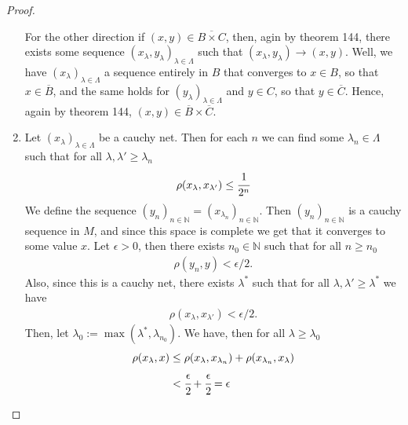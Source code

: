 \documentclass[12pt]{extarticle}
\newcommand{\N}{\mathbb{N}}
\newcommand{\<}{\langle}
\renewcommand{\>}{\rangle}
\theoremstyle{definition}
\begin{document}
\begin{proof}
\begin{enumerate}
    For the other direction if $(x,y) \in \overline{B \times C}$, then, agin by theorem 144, there exists some sequence
    $(x_{\lambda}, y_{\lambda})_{\lambda \in \Lambda}$ such that $(x_{\lambda}, y_{\lambda}) \to (x,y)$. Well, we have $(x_{\lambda})_{\lambda \in \Lambda}$ a sequence entirely in $B$ that converges to $x \in B$,
    so that $x \in \overline{B}$, and the same holds for $(y_{\lambda})_{\lambda \in \Lambda}$ and $y \in C$, so that $y \in \overline{C}$. Hence, again by theorem 144, $(x,y) \in \overline{B} \times \overline{C}$.
  \item
    Let $(x_{\lambda})_{\lambda \in \Lambda}$ be a cauchy net. Then for each $n$ we can find some $\lambda_n \in \Lambda$ such that for all $\lambda, \lambda' \geq \lambda_n$
    \begin{align*}
      \rho(x_{\lambda}, x_{\lambda'}) \leq \cfrac{1}{2^n}
    \end{align*}
    We define the sequence $(y_n)_{n \in \N} = (x_{\lambda_n})_{n \in \N}$. Then $(y_n)_{n \in \N}$ is a cauchy sequence in $M$, and since
    this space is complete we get that it converges to some value $x$. Let $\epsilon>0$, then there exists $n_0 \in \N$ such that for all $n \geq n_0$
    \begin{align*}
      \rho(y_n, y) < \epsilon/2.
    \end{align*}
    Also, since this is a cauchy net, there exists $\lambda^{*}$ such that for all $\lambda, \lambda' \geq \lambda^{*}$ we have
    \begin{align*}
      \rho(x_{\lambda}, x_{\lambda'}) < \epsilon/2.
    \end{align*}
    Then, let $\lambda_0 := \max(\lambda^{*}, \lambda_{n_0})$. We have, then for all $\lambda \geq \lambda_0$
    \begin{align*}
      \rho(x_{\lambda}, x) &\leq \rho(x_{\lambda}, x_{\lambda_n}) + \rho(x_{\lambda_n}, x_{\lambda})  \\
      & < \cfrac{\epsilon}{2} + \cfrac{\epsilon}{2} = \epsilon
    \end{align*}
  \end{enumerate}
\end{proof}
\end{document}
